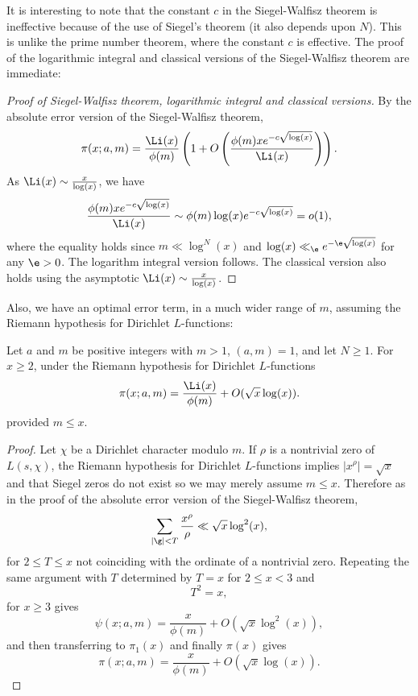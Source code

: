       It is interesting to note that the constant $c$ in the Siegel-Walfisz theorem is ineffective because of the use of Siegel's theorem (it also depends upon $N$). This is unlike the prime number theorem, where the constant $c$ is effective. The proof of the logarithmic integral and classical versions of the Siegel-Walfisz theorem are immediate:

      \begin{proof}[Proof of Siegel-Walfisz theorem, logarithmic integral and classical versions]
        By the absolute error version of the Siegel-Walfisz theorem,
        \[
          \pi(x;a,m) = \frac{\Li(x)}{\phi(m)}\left(1+O\left(\frac{\phi(m)xe^{-c\sqrt{\log(x)}}}{\Li(x)}\right)\right).
        \]
        As $\Li(x) \sim \frac{x}{\log(x)}$, we have
        \[
          \frac{\phi(m)xe^{-c\sqrt{\log(x)}}}{\Li(x)} \sim \phi(m)\log(x)e^{-c\sqrt{\log(x)}} = o(1),
        \]
        where the equality holds since $m \ll \log^{N}(x)$ and $\log(x) \ll_{\e} e^{-\e\sqrt{\log(x)}}$ for any $\e > 0$. The logarithm integral version follows. The classical version also holds using the asymptotic $\Li(x) \sim \frac{x}{\log(x)}$.
      \end{proof}
      
      
      
       Also, we have an optimal error term, in a much wider range of $m$, assuming the Riemann hypothesis for Dirichlet $L$-functions:
      
      \begin{proposition}
        Let $a$ and $m$ be positive integers with $m > 1$, $(a,m) = 1$, and let $N \ge 1$. For $x \ge 2$, under the Riemann hypothesis for Dirichlet $L$-functions
        \[
          \pi(x;a,m) = \frac{\Li(x)}{\phi(m)}+O(\sqrt{x}\log(x)).
        \]
        provided $m \le x$.
      \end{proposition}
      \begin{proof}
        Let $\chi$ be a Dirichlet character modulo $m$. If $\rho$ is a nontrivial zero of $L(s,\chi)$, the Riemann hypothesis for Dirichlet $L$-functions implies $|x^{\rho}| = \sqrt{x}$ and that Siegel zeros do not exist so we may merely assume $m \le x$. Therefore as in the proof of the absolute error version of the Siegel-Walfisz theorem,
        \[
          \sum_{|\g| < T}\frac{x^{\rho}}{\rho} \ll \sqrt{x}\log^{2}(x),
        \]
        for $2 \le T \le x$ not coinciding with the ordinate of a nontrivial zero. Repeating the same argument with $T$ determined by $T = x$ for $2 \le x < 3$ and 
        \[
          T^{2} = x,
        \]
        for $x \ge 3$ gives
        \[
          \psi(x;a,m) = \frac{x}{\phi(m)}+O(\sqrt{x}\log^{2}(x)),
        \]
        and then transferring to $\pi_{1}(x)$ and finally $\pi(x)$ gives
        \[
          \pi(x;a,m) = \frac{x}{\phi(m)}+O(\sqrt{x}\log(x)).
        \]
      \end{proof}